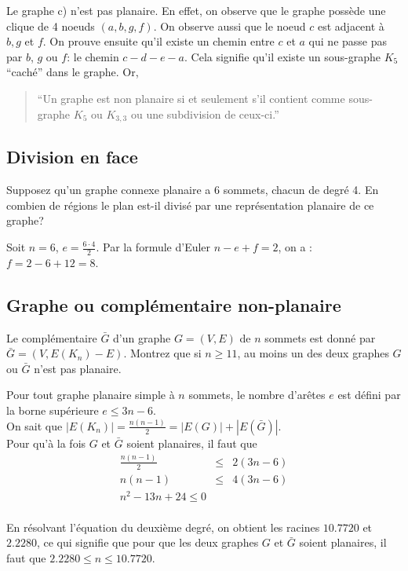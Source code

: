 \begin{solution}
  Le graphe c) n'est pas planaire.
  En effet, on observe que le graphe possède une clique de 4 noeuds $(a,b,g,f)$.
  On observe aussi que le noeud $c$ est adjacent à $b, g$ et $f$.
  On prouve ensuite qu'il existe un chemin entre $c$ et $a$ qui ne passe pas par $b$, $g$ ou $f$:
  le chemin $c-d-e-a$. Cela signifie qu'il existe un sous-graphe $K_5$ ``caché'' dans le graphe. Or,

  \begin{quotation}
    ``Un graphe est non planaire si et seulement s’il contient comme sous-graphe $K_5$ ou $K_{3,3}$ ou une subdivision de ceux-ci.''
  \end{quotation}

\end{solution}

\subsection{Division en face}
Supposez qu’un graphe connexe planaire a 6 sommets, chacun de degré 4. En combien de régions le plan est-il divisé par une représentation planaire de ce graphe?

\begin{solution} Soit $n = 6$, $e = \frac{6 \cdot 4}{2}$. Par la formule d'Euler $ n - e + f = 2$, on a : $f = 2 - 6 + 12 = 8$.
\end{solution}

\subsection{Graphe ou complémentaire non-planaire}
Le complémentaire $\bar{G}$ d’un graphe $G = (V,E)$ de $n$ sommets est donné par $\bar{G} = (V, E(K_n) - E)$. Montrez que si $n \geq 11$, au moins un des deux graphes $G$ ou $\bar{G}$ n’est pas planaire.

\begin{solution} Pour tout graphe planaire simple à $n$ sommets, le nombre d'arêtes $e$ est défini par la borne supérieure  $e \leq 3n - 6$. \\
On sait que $|E(K_{n})| = \frac{n(n-1)}{2} = |E(G)| + |E(\bar{G})|$. \\
Pour qu'à la fois $G$ et $\bar{G}$ soient planaires, il faut que 
\[ \begin{array}{rcl}
 \frac{n(n-1)}{2} &\leq& 2 (3n - 6) \\
  n(n-1) &\leq& 4(3n - 6) \\
  n^2 - 13n + 24 \leq 0 \\
 \end{array} \]
 
 En résolvant l'équation du deuxième degré, on obtient les racines $10.7720$ et $2.2280$, ce qui signifie que pour que les deux graphes $G$ et $\bar{G}$ soient planaires, il faut que $2.2280 \leq n \leq 10.7720$.
 \end{solution}


